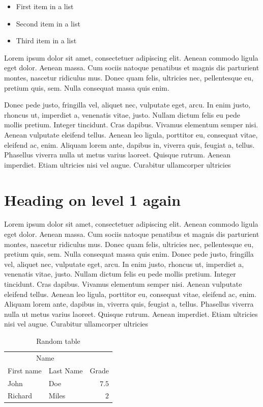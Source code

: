 \begin{itemize}
	\item First item in a list 
	\item Second item in a list 
	\item Third item in a list
\end{itemize}

Lorem ipsum dolor sit amet, consectetuer adipiscing elit. Aenean commodo ligula
eget dolor. Aenean massa. Cum sociis natoque penatibus et magnis dis parturient
montes, nascetur ridiculus mus. Donec quam felis, ultricies nec, pellentesque
eu, pretium quis, sem. Nulla consequat massa quis enim. 

Donec pede justo, fringilla vel, aliquet nec, vulputate eget, arcu. In enim
justo, rhoncus ut, imperdiet a, venenatis vitae, justo. Nullam dictum felis eu
pede mollis pretium. Integer tincidunt. Cras dapibus. Vivamus elementum semper
nisi. Aenean vulputate eleifend tellus. Aenean leo ligula, porttitor eu,
consequat vitae, eleifend ac, enim. Aliquam lorem ante, dapibus in, viverra
quis, feugiat a, tellus. Phasellus viverra nulla ut metus varius laoreet.
Quisque rutrum. Aenean imperdiet. Etiam ultricies nisi vel augue. Curabitur
ullamcorper ultricies 

\section*{Heading on level 1 again}

Lorem ipsum dolor sit amet, consectetuer adipiscing elit. Aenean commodo ligula
eget dolor. Aenean massa. Cum sociis natoque penatibus et magnis dis parturient
montes, nascetur ridiculus mus. Donec quam felis, ultricies nec, pellentesque
eu, pretium quis, sem. Nulla consequat massa quis enim. Donec pede justo,
fringilla vel, aliquet nec, vulputate eget, arcu. In enim justo, rhoncus ut,
imperdiet a, venenatis vitae, justo. Nullam dictum felis eu pede mollis
pretium. Integer tincidunt. Cras dapibus. Vivamus elementum semper nisi. Aenean
vulputate eleifend tellus. Aenean leo ligula, porttitor eu, consequat vitae,
eleifend ac, enim. Aliquam lorem ante, dapibus in, viverra quis, feugiat a,
tellus. Phasellus viverra nulla ut metus varius laoreet. Quisque rutrum. Aenean
imperdiet. Etiam ultricies nisi vel augue. Curabitur ullamcorper ultricies 

\begin{table}
\caption{Random table}
\centering
	\begin{tabular}{llr}
		\toprule
		\multicolumn{2}{c}{Name} \\
		\cmidrule(r){1-2}
			First name & Last Name & Grade \\
		\midrule
			John & Doe & $7.5$ \\
			Richard & Miles & $2$ \\
		\bottomrule
	\end{tabular}
\end{table}

